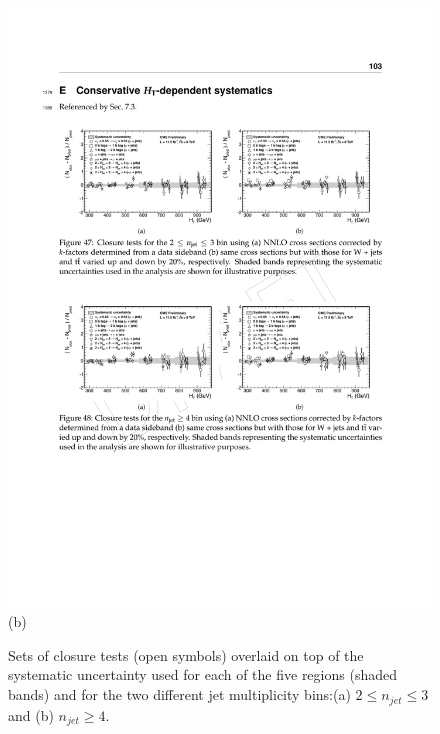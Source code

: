 \begin{figure}[ht]
\begin{minipage}[b]{0.48\linewidth}
\includegraphics[width = 1.0\linewidth]{plots/syst-le3j_varied.pdf}
\centering
(b) 
\end{minipage}
\caption[Sets of closure tests overlaid on top of the systematic uncertainty used for each of the five \theht regions.]{Sets of closure tests (open symbols) overlaid on top of the systematic uncertainty used for each of the five \theht regions (shaded bands) and for the two different jet multiplicity bins:(a) $2 \leq n_{jet} \leq 3$ and (b) $n_{jet} \geq 4$.}
\label{fig:xsecvariedle3j}
\end{figure}


